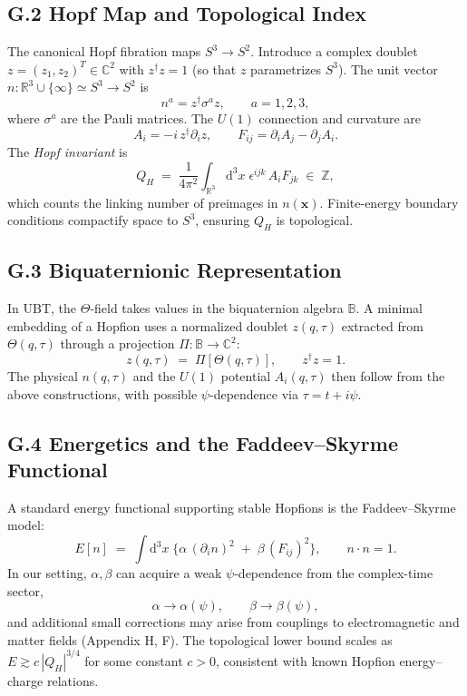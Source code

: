 \documentclass[12pt,a4paper]{article}
\numberwithin{equation}{section}
\theoremstyle{definition}
\theoremstyle{remark}
\begin{document}
\subsection*{G.2 Hopf Map and Topological Index}
The canonical Hopf fibration maps $S^3 \to S^2$. 
Introduce a complex doublet $z=(z_1,z_2)^T\in\mathbb{C}^2$ with $z^\dagger z = 1$ (so that $z$ parametrizes $S^3$). 
The unit vector $n:\mathbb{R}^3\cup\{\infty\}\simeq S^3 \to S^2$ is
\begin{equation}
n^a = z^\dagger \sigma^a z,\qquad a=1,2,3,
\end{equation}
where $\sigma^a$ are the Pauli matrices. The $U(1)$ connection and curvature are
\begin{equation}
A_i = -i\, z^\dagger \partial_i z,\qquad F_{ij} = \partial_i A_j - \partial_j A_i.
\end{equation}
The \emph{Hopf invariant} is
\begin{equation}
Q_H \;=\; \frac{1}{4\pi^2}\int_{\mathbb{R}^3} \mathrm{d}^3x\; \epsilon^{ijk}\, A_i F_{jk} \;\in\; \mathbb{Z},
\end{equation}
which counts the linking number of preimages in $n(\mathbf{x})$. Finite-energy boundary conditions compactify space to $S^3$, ensuring $Q_H$ is topological.

\subsection*{G.3 Biquaternionic Representation}
In UBT, the $\Theta$-field takes values in the biquaternion algebra $\mathbb{B}$. 
A minimal embedding of a Hopfion uses a normalized doublet $z(q,\tau)$ extracted from $\Theta(q,\tau)$ through a projection $\Pi:\mathbb{B}\to\mathbb{C}^2$:
\begin{equation}
z(q,\tau) \;=\; \Pi\!\left[\Theta(q,\tau)\right],\qquad z^\dagger z = 1.
\end{equation}
The physical $n(q,\tau)$ and the $U(1)$ potential $A_i(q,\tau)$ then follow from the above constructions, with possible $\psi$-dependence via $\tau=t+i\psi$.

\subsection*{G.4 Energetics and the Faddeev--Skyrme Functional}
A standard energy functional supporting stable Hopfions is the Faddeev--Skyrme model:
\begin{equation}
E[n] \;=\; \int\! \mathrm{d}^3x \;\Big\{ \alpha\, (\partial_i n)^2 \;+\; \beta\, (F_{ij})^2 \Big\},\qquad n\cdot n=1.
\end{equation}
In our setting, $\alpha,\beta$ can acquire a weak $\psi$-dependence from the complex-time sector,
\begin{equation}
\alpha \to \alpha(\psi),\qquad \beta \to \beta(\psi),
\end{equation}
and additional small corrections may arise from couplings to electromagnetic and matter fields (Appendix H, F). 
The topological lower bound scales as $E \gtrsim c\, |Q_H|^{3/4}$ for some constant $c>0$, consistent with known Hopfion energy--charge relations.
\end{document}
